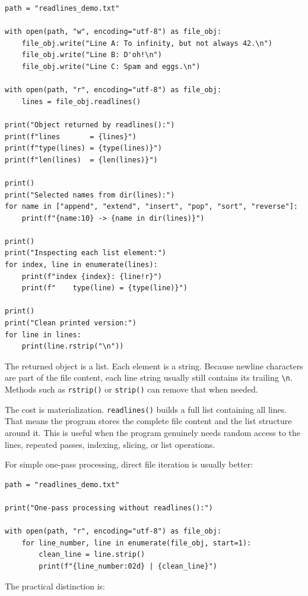 \begin{verbatim}
path = "readlines_demo.txt"

with open(path, "w", encoding="utf-8") as file_obj:
    file_obj.write("Line A: To infinity, but not always 42.\n")
    file_obj.write("Line B: D'oh!\n")
    file_obj.write("Line C: Spam and eggs.\n")

with open(path, "r", encoding="utf-8") as file_obj:
    lines = file_obj.readlines()

print("Object returned by readlines():")
print(f"lines       = {lines}")
print(f"type(lines) = {type(lines)}")
print(f"len(lines)  = {len(lines)}")

print()
print("Selected names from dir(lines):")
for name in ["append", "extend", "insert", "pop", "sort", "reverse"]:
    print(f"{name:10} -> {name in dir(lines)}")

print()
print("Inspecting each list element:")
for index, line in enumerate(lines):
    print(f"index {index}: {line!r}")
    print(f"    type(line) = {type(line)}")

print()
print("Clean printed version:")
for line in lines:
    print(line.rstrip("\n"))
\end{verbatim}

The returned object is a list. Each element is a string. Because newline characters are part of the file content, each line string usually still contains its trailing \texttt{\textbackslash n}. Methods such as \texttt{rstrip()} or \texttt{strip()} can remove that when needed.

The cost is materialization. \texttt{readlines()} builds a full list containing all lines. That means the program stores the complete file content and the list structure around it. This is useful when the program genuinely needs random access to the lines, repeated passes, indexing, slicing, or list operations.

For simple one-pass processing, direct file iteration is usually better:

\begin{verbatim}
path = "readlines_demo.txt"

print("One-pass processing without readlines():")

with open(path, "r", encoding="utf-8") as file_obj:
    for line_number, line in enumerate(file_obj, start=1):
        clean_line = line.strip()
        print(f"{line_number:02d} | {clean_line}")
\end{verbatim}

The practical distinction is:

